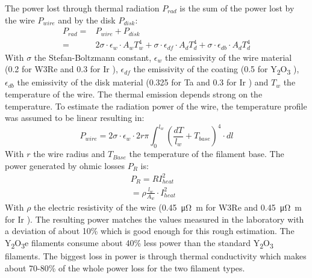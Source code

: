 		The power lost through thermal radiation $P_{rad}$ is the sum of the power lost by the wire $P_{wire}$ and by the disk $P_{disk}$:
		\begin{align}
			P_{rad} =& P_{wire} + P_{disk}\\
					=& 2\sigma\cdot\epsilon_{w}\cdot A_w T_w^4 + \sigma\cdot\epsilon_{df}\cdot A_d T_d^4 + \sigma\cdot\epsilon_{db}\cdot A_d T_d^4
		\end{align}
		With $\sigma$ the Stefan-Boltzmann constant, $\epsilon_{w}$ the emissivity of the wire material (0.2 for W3Re \cite{thermcondTungst} and 0.3 for Ir \cite{Burgess1914}), $\epsilon_{df}$ the emissivity of the coating (0.5 for Y\textsubscript{2}O\textsubscript{3} \cite{ThermEmiss_Y2O3}), $\epsilon_{db}$ the emissivity of the disk material (0.325 for Ta \cite{ThermalEmiss_Ta} and 0.3 for Ir \cite{Burgess1914}) and $T_w$ the temperature of the wire. The thermal emission depends strong on the temperature. To estimate the radiation power of the wire, the temperature profile was assumed to be linear resulting in:
		\begin{equation}
			P_{wire} = 2\sigma\cdot\epsilon_{w}\cdot2r\pi\int_{0}^{l_w} \left(\frac{dT}{l_w} + T_{base}\right)^4\cdot dl
		\end{equation}
		With $r$ the wire radius and $T_{Base}$ the temperature of the filament base. The power generated by ohmic losses $P_R$ is:
		\begin{align}
			P_R = RI_{heat}^2&\\
				= \rho\frac{l_w}{A_w}\cdot I_{heat}^2&
		\end{align}
		With $\rho$ the electric resistivity of the wire (0.45~\si{\micro\ohm\meter} for W3Re \cite{thermResistTungst} and 0.45~\si{\micro\ohm\meter} for Ir \cite{Arblaster2016}). The resulting power matches the values measured in the laboratory with a deviation of about 10\% which is good enough for this rough estimation. The Y\textsubscript{2}O\textsubscript{3}e filaments consume about 40\% less power than the standard Y\textsubscript{2}O\textsubscript{3} filaments. The biggest loss in power is through thermal conductivity which makes about 70-80\% of the whole power loss for the two filament types.
		
		
